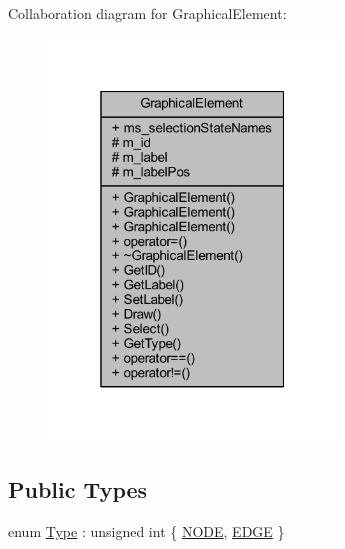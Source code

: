 Collaboration diagram for Graphical\+Element\+:
\nopagebreak
\begin{figure}[H]
\begin{center}
\leavevmode
\includegraphics[width=217pt]{class_graphical_element__coll__graph}
\end{center}
\end{figure}
\subsection*{Public Types}
\begin{DoxyCompactItemize}
\item 
enum \hyperlink{class_graphical_element_aa485be48b901d85de97b3bd86f381d9e}{Type} \+: unsigned int \{ \hyperlink{class_graphical_element_aa485be48b901d85de97b3bd86f381d9ead7107fc1a13076e7d37baa5bcab76515}{N\+O\+DE}, 
\hyperlink{class_graphical_element_aa485be48b901d85de97b3bd86f381d9ea3d2a2290806febda78ebe8200e43e4d8}{E\+D\+GE}
 \}
\end{DoxyCompactItemize}
